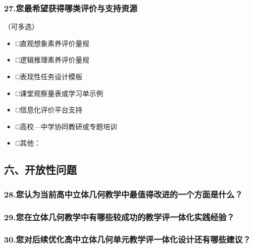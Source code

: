 \documentclass[UTF8,a4paper,12pt,twoside]{ctexart}
\begin{document}
\subsubsection*{27.您最希望获得哪类评价与支持资源}
（可多选）
\begin{itemize}
\item □直观想象素养评价量规
\item □逻辑推理素养评价量规
\item □表现性任务设计模板
\item □课堂观察量表或学习单示例
\item □信息化评价平台支持
\item □高校—中学协同教研或专题培训
\item □其他：\underline{\hspace{2cm}}
\end{itemize}

\subsection*{六、开放性问题}

\subsubsection*{28.您认为当前高中立体几何教学中最值得改进的一个方面是什么？}

\subsubsection*{29.您在立体几何教学中有哪些较成功的教学评一体化实践经验？}

\subsubsection*{30.您对后续优化高中立体几何单元教学评一体化设计还有哪些建议？}
\end{document}
